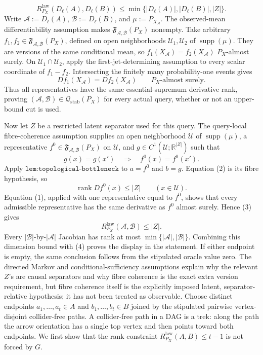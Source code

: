 \[
 R^{\mathrm{law}}_{P_X}(D_\ell(A),D_\ell(B))
 \leq
 \min\{|D_\ell(A)|,|D_\ell(B)|,|Z|\}.
\]
Write \(\mathcal A:=D_\ell(A)\), \(\mathcal B:=D_\ell(B)\), and \(\mu:=P_{X_{\mathcal A}}\).  The observed-mean differentiability assumption makes \(\mathfrak F_{\mathcal A,\mathcal B}(P_X)\) nonempty.  Take arbitrary \(f_1,f_2\in\mathfrak F_{\mathcal A,\mathcal B}(P_X)\), defined on open neighborhoods \(\mathcal U_1,\mathcal U_2\) of \(\operatorname{supp}(\mu)\).  They are versions of the same conditional mean, so \(f_1(X_{\mathcal A})=f_2(X_{\mathcal A})\) \(P_X\)-almost surely.  On \(\mathcal U_1\cap\mathcal U_2\), apply the first-jet-determining assumption to every scalar coordinate of \(f_1-f_2\).  Intersecting the finitely many probability-one events gives
\[
 Df_1(X_{\mathcal A})=Df_2(X_{\mathcal A})
 \qquad P_X\text{-almost surely}. \tag{1}
\]
Thus all representatives have the same essential-supremum derivative rank, proving \((\mathcal A,\mathcal B)\in\mathcal Q_{\mathrm{stab}}(P_X)\) for every actual query, whether or not an upper-bound cut is used.

Now let \(Z\) be a restricted latent separator used for this query.  The query-local fibre-coherence assumption supplies an open neighborhood \(\mathcal U\) of \(\operatorname{supp}(\mu)\), a representative \(f^0\in\mathfrak F_{\mathcal A,\mathcal B}(P_X)\) on \(\mathcal U\), and \(g\in C^1(\mathcal U;\mathbb R^{|Z|})\) such that
\[
 g(x)=g(x')\quad\Longrightarrow\quad f^0(x)=f^0(x'). \tag{2}
\]
Apply \(\texttt{lem:topological-bottleneck}\) to \(a=f^0\) and \(b=g\).  Equation (2) is its fibre hypothesis, so
\[
 \operatorname{rank}Df^0(x)\leq |Z|
 \qquad(x\in\mathcal U). \tag{3}
\]
Equation (1), applied with one representative equal to \(f^0\), shows that every admissible representative has the same derivative as \(f^0\) almost surely.  Hence (3) gives
\[
 R^{\mathrm{law}}_{P_X}(\mathcal A,\mathcal B)\leq |Z|. \tag{4}
\]
Every \(|\mathcal B|\)-by-\(|\mathcal A|\) Jacobian has rank at most \(\min\{|\mathcal A|,|\mathcal B|\}\).  Combining this dimension bound with (4) proves the display in the statement.  If either endpoint is empty, the same conclusion follows from the stipulated oracle value zero.  The directed Markov and conditional-sufficiency assumptions explain why the relevant \(Z\)'s are causal separators and why fibre coherence is the exact extra version requirement, but fibre coherence itself is the explicitly imposed latent, separator-relative hypothesis; it has not been treated as observable.
Choose distinct endpoints \(a_1,\ldots,a_t\in A\) and \(b_1,\ldots,b_t\in B\) joined by the stipulated pairwise vertex-disjoint collider-free paths.  A collider-free path in a DAG is a trek: along the path the arrow orientation has a single top vertex and then points toward both endpoints.  We first show that the rank constraint \(R^{\mathrm{law}}_{P_X}(A,B)\leq t-1\) is not forced by \(G\).

